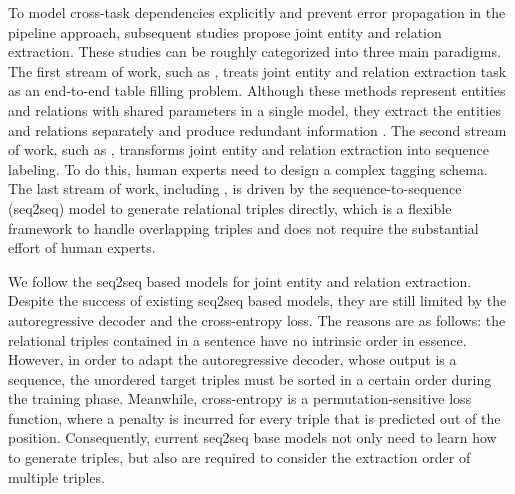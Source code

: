 \documentclass[letterpaper]{article} \usepackage{aaai21}  \usepackage{times}  \usepackage{helvet} \usepackage{courier}  \usepackage[hyphens]{url}  \usepackage{graphicx} \usepackage{amsfonts,amssymb}
\begin{document}
To model cross-task dependencies explicitly and prevent error propagation in the pipeline approach, subsequent studies propose joint entity and relation extraction. These studies can be roughly categorized into three main
paradigms. The first stream of work, such as \citet{miwa2016end,gupta2016table,zhang2017end}, treats joint entity and relation extraction task as an end-to-end table filling problem. Although these methods represent entities and relations with shared parameters in a single model, they extract the entities and relations separately and produce redundant information \cite{zheng2017joint}. The second stream of work, such as \citet{zheng2017joint,dai2019joint,wei-etal-2020-novel}, transforms joint entity and relation extraction into sequence labeling. To do this, human experts need to design a complex tagging schema. The last stream of work, including \citet{zeng2018extracting,zeng2019learning,nayak2019ptrnetdecoding,zeng2020copymtl}, is driven by the sequence-to-sequence (seq2seq) model \cite{sutskever2014sequence} to generate relational triples directly, which is a flexible framework to handle overlapping triples and does not require the substantial effort of human experts.

We follow the seq2seq based models for joint entity and relation extraction. Despite the success of existing seq2seq based models, they are still limited by the autoregressive decoder and the cross-entropy loss. The reasons are as follows: the relational triples contained in a sentence have no intrinsic order in essence. However, in order to adapt the autoregressive decoder, whose output is a sequence,  the unordered target triples must be sorted in a certain order during the training phase. Meanwhile, cross-entropy is a permutation-sensitive loss function, where a penalty is incurred for every triple that is predicted out of the position. Consequently, current seq2seq base models not only need to learn how to generate triples, but also are required to consider the extraction order of multiple triples. 
\end{document}
